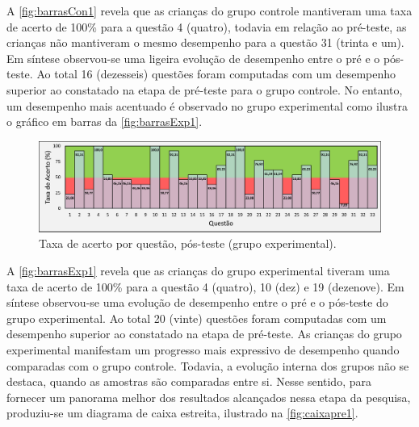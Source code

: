 A \autoref{fig:barrasCon1} revela que as crianças do grupo controle mantiveram uma taxa de acerto de 100\% para a questão 4 (quatro), todavia em relação ao pré-teste, as crianças não mantiveram o mesmo desempenho para a questão 31 (trinta e um). Em síntese observou-se uma ligeira evolução de desempenho entre o pré e o pós-teste. Ao total 16 (dezesseis) questões foram computadas com um desempenho superior ao constatado na etapa de pré-teste para o grupo controle. 
No entanto, um desempenho mais acentuado é observado no grupo experimental como ilustra o gráfico em barras da \autoref{fig:barrasExp1}.


\begin{figure}[htb]

    \caption{\label{fig:barrasExp1}Taxa de acerto por questão, pós-teste (grupo experimental).}
    \includegraphics[width=\linewidth]{./Visuais/NotasExperimentalPOS.pdf}
  
\end{figure}

A \autoref{fig:barrasExp1} revela que as crianças do grupo experimental tiveram uma taxa de acerto de 100\% para a questão 4 (quatro), 10 (dez) e 19 (dezenove).  Em síntese observou-se uma evolução de desempenho entre o pré e o pós-teste do grupo experimental. Ao total 20 (vinte) questões foram computadas com um desempenho superior ao constatado na etapa de pré-teste.
As crianças do grupo experimental manifestam um progresso mais expressivo de desempenho quando comparadas com o grupo controle. Todavia, a evolução interna dos grupos não se destaca, quando as amostras são comparadas entre si. Nesse sentido, para fornecer um panorama melhor dos resultados alcançados nessa etapa da pesquisa, produziu-se um diagrama de caixa estreita, ilustrado na \autoref{fig:caixapre1}.

